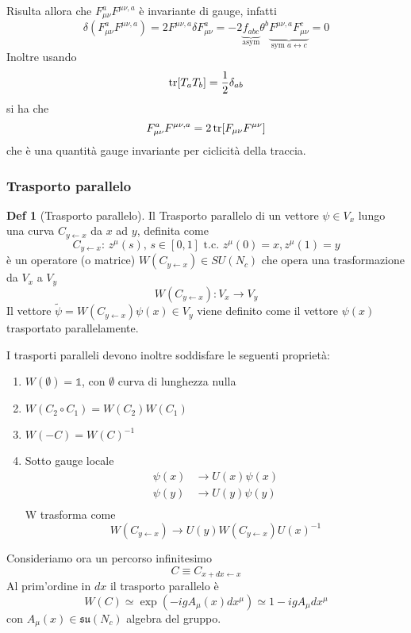 \documentclass[10pt,a4paper]{article}
\theoremstyle{definition}
\newtheorem{definition}{Def}[section]
\newcommand{\id}{\mathbb{1}}
\begin{document}
Risulta allora che \(F_{\mu\nu}^a F^{\mu\nu,a}\) è invariante di gauge, infatti
\[
\delta(F_{\mu\nu}^a F^{\mu\nu,a}) = 2 F^{\mu\nu,a} \delta F_{\mu\nu}^a = -2\underbrace{f_{abc}}_{\text{asym}}\theta^b \underbrace{F^{\mu\nu,a}F_{\mu\nu}^c}_{\text{sym } a \leftrightarrow c} = 0     
\]
Inoltre usando 
\[
\tr [T_a T_b] = \frac12 \delta_{ab}    
\]
si ha che
\[
    F_{\mu\nu}^a F^{\mu\nu,a} = 2 \tr[F_{\mu\nu}F^{\mu\nu}]    
\]
che è una quantità gauge invariante per ciclicità della traccia.

\subsubsection{Trasporto parallelo}
\begin{definition}[Trasporto parallelo]
    Il Trasporto parallelo di un vettore $\psi \in V_x$ lungo una curva \(C_{y \leftarrow x}\) da $x$ ad $y$, definita come
    \[
        C_{y \leftarrow x}:\, z^\mu(s), \, s \in [0,1] \text{ t.c. } z^\mu(0) = x, z^\mu(1) = y
    \]
    è un operatore (o matrice) \(W (C_{y \leftarrow x}) \in SU(N_c)\) che opera una trasformazione da $V_x$ a $V_y$
    \[
    W(C_{y \leftarrow x}):V_x \to V_y    
    \]
    Il vettore \(\tilde{\psi} = W(C_{y \leftarrow x})\psi(x) \in V_y\) viene definito come il vettore $\psi(x)$ trasportato parallelamente.

    I trasporti paralleli devono inoltre soddisfare le seguenti proprietà:
    \begin{enumerate}
        \item \(W(\emptyset) = \id\), con $\emptyset$ curva di lunghezza nulla
        \item \(W(C_2 \circ C_1) = W(C_2)W(C_1)\) \label{comp}
        \item \(W(-C) = W(C)^{-1}\)
        \item Sotto gauge locale \label{tr par}
        \begin{align*}
            \psi(x) &\to U(x)\psi(x) \\
            \psi(y) &\to U(y)\psi(y) \\
        \end{align*}
        W trasforma come
        \[
            W(C_{y \leftarrow x}) \to U(y)W(C_{y \leftarrow x})U(x)^{-1}    
            \]
        \end{enumerate}
\end{definition}
Consideriamo ora un percorso infinitesimo
\[
C \equiv C_{x + dx \leftarrow x}    
\]
Al prim'ordine in $dx$ il trasporto parallelo è
\[
W(C) \simeq \exp(-igA_\mu(x)dx^\mu) \simeq 1 - igA_\mu dx^\mu 
\]
con \(A_\mu(x) \in \mathfrak{su}(N_c)\) algebra del gruppo.
\end{document}
